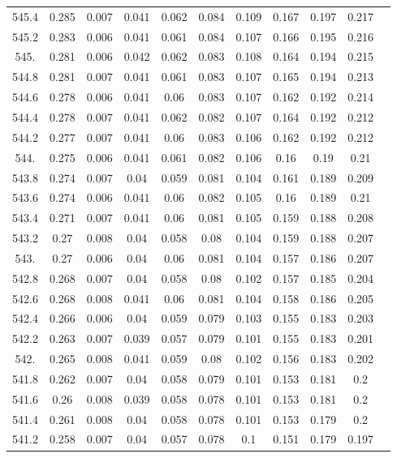 \documentclass[12pt]{ctexart}
\numberwithin{equation}{section}
\begin{document}
\begin{longtable}{ccccccccccc}
545.4	&	0.285	&	0.007	&	0.041	&	0.062	&	0.084	&	0.109	&	0.167	&	0.197	&	0.217	\\
545.2	&	0.283	&	0.006	&	0.041	&	0.061	&	0.084	&	0.107	&	0.166	&	0.195	&	0.216	\\
545.	&	0.281	&	0.006	&	0.042	&	0.062	&	0.083	&	0.108	&	0.164	&	0.194	&	0.215	\\
544.8	&	0.281	&	0.007	&	0.041	&	0.061	&	0.083	&	0.107	&	0.165	&	0.194	&	0.213	\\
544.6	&	0.278	&	0.006	&	0.041	&	0.06	&	0.083	&	0.107	&	0.162	&	0.192	&	0.214	\\
544.4	&	0.278	&	0.007	&	0.041	&	0.062	&	0.082	&	0.107	&	0.164	&	0.192	&	0.212	\\
544.2	&	0.277	&	0.007	&	0.041	&	0.06	&	0.083	&	0.106	&	0.162	&	0.192	&	0.212	\\
544.	&	0.275	&	0.006	&	0.041	&	0.061	&	0.082	&	0.106	&	0.16	&	0.19	&	0.21	\\
543.8	&	0.274	&	0.007	&	0.04	&	0.059	&	0.081	&	0.104	&	0.161	&	0.189	&	0.209	\\
543.6	&	0.274	&	0.006	&	0.041	&	0.06	&	0.082	&	0.105	&	0.16	&	0.189	&	0.21	\\
543.4	&	0.271	&	0.007	&	0.041	&	0.06	&	0.081	&	0.105	&	0.159	&	0.188	&	0.208	\\
543.2	&	0.27	&	0.008	&	0.04	&	0.058	&	0.08	&	0.104	&	0.159	&	0.188	&	0.207	\\
543.	&	0.27	&	0.006	&	0.04	&	0.06	&	0.081	&	0.104	&	0.157	&	0.186	&	0.207	\\
542.8	&	0.268	&	0.007	&	0.04	&	0.058	&	0.08	&	0.102	&	0.157	&	0.185	&	0.204	\\
542.6	&	0.268	&	0.008	&	0.041	&	0.06	&	0.081	&	0.104	&	0.158	&	0.186	&	0.205	\\
542.4	&	0.266	&	0.006	&	0.04	&	0.059	&	0.079	&	0.103	&	0.155	&	0.183	&	0.203	\\
542.2	&	0.263	&	0.007	&	0.039	&	0.057	&	0.079	&	0.101	&	0.155	&	0.183	&	0.201	\\
542.	&	0.265	&	0.008	&	0.041	&	0.059	&	0.08	&	0.102	&	0.156	&	0.183	&	0.202	\\
541.8	&	0.262	&	0.007	&	0.04	&	0.058	&	0.079	&	0.101	&	0.153	&	0.181	&	0.2	\\
541.6	&	0.26	&	0.008	&	0.039	&	0.058	&	0.078	&	0.101	&	0.153	&	0.181	&	0.2	\\
541.4	&	0.261	&	0.008	&	0.04	&	0.058	&	0.078	&	0.101	&	0.153	&	0.179	&	0.2	\\
541.2	&	0.258	&	0.007	&	0.04	&	0.057	&	0.078	&	0.1	&	0.151	&	0.179	&	0.197	\\

\end{longtable}
\end{document}
